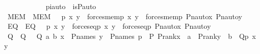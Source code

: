 \begin{isabellebody}
%
\isadelimproof
%
\endisadelimproof
%
\isatagproof
{}\isamarkupfalse%
\ {\isacharminus}{\kern0pt}\ \isanewline
\ \ \isamarkupfalse%
\ {\isasympi}\ \isanewline
\ \ \isamarkupfalse%
\ piauto\ {\isacharcolon}{\kern0pt}\ {\isachardoublequoteopen}is{\isacharunderscore}{\kern0pt}P{\isacharunderscore}{\kern0pt}auto{\isacharparenleft}{\kern0pt}{\isasympi}{\isacharparenright}{\kern0pt}{\isachardoublequoteclose}\isanewline
\isanewline
\ \ \isamarkupfalse%
\ MEM\ \ {\isachardoublequoteopen}MEM\ {\isasymequiv}\ {\isasymlambda}\ p\ x\ y\ {\isachardot}{\kern0pt}\ {\isacharparenleft}{\kern0pt}forces{\isacharunderscore}{\kern0pt}mem{\isacharparenleft}{\kern0pt}p{\isacharcomma}{\kern0pt}\ x{\isacharcomma}{\kern0pt}\ y{\isacharparenright}{\kern0pt}\ {\isasymlongleftrightarrow}\ forces{\isacharunderscore}{\kern0pt}mem{\isacharparenleft}{\kern0pt}{\isasympi}{\isacharbackquote}{\kern0pt}p{\isacharcomma}{\kern0pt}\ Pn{\isacharunderscore}{\kern0pt}auto{\isacharparenleft}{\kern0pt}{\isasympi}{\isacharparenright}{\kern0pt}{\isacharbackquote}{\kern0pt}x{\isacharcomma}{\kern0pt}\ Pn{\isacharunderscore}{\kern0pt}auto{\isacharparenleft}{\kern0pt}{\isasympi}{\isacharparenright}{\kern0pt}{\isacharbackquote}{\kern0pt}y{\isacharparenright}{\kern0pt}{\isacharparenright}{\kern0pt}{\isachardoublequoteclose}\isanewline
\ \ \isamarkupfalse%
\ EQ\ \ {\isachardoublequoteopen}EQ\ {\isasymequiv}\ {\isasymlambda}\ p\ x\ y\ {\isachardot}{\kern0pt}\ {\isacharparenleft}{\kern0pt}forces{\isacharunderscore}{\kern0pt}eq{\isacharparenleft}{\kern0pt}p{\isacharcomma}{\kern0pt}\ x{\isacharcomma}{\kern0pt}\ y{\isacharparenright}{\kern0pt}\ {\isasymlongleftrightarrow}\ forces{\isacharunderscore}{\kern0pt}eq{\isacharparenleft}{\kern0pt}{\isasympi}{\isacharbackquote}{\kern0pt}p{\isacharcomma}{\kern0pt}\ Pn{\isacharunderscore}{\kern0pt}auto{\isacharparenleft}{\kern0pt}{\isasympi}{\isacharparenright}{\kern0pt}{\isacharbackquote}{\kern0pt}x{\isacharcomma}{\kern0pt}\ Pn{\isacharunderscore}{\kern0pt}auto{\isacharparenleft}{\kern0pt}{\isasympi}{\isacharparenright}{\kern0pt}{\isacharbackquote}{\kern0pt}y{\isacharparenright}{\kern0pt}{\isacharparenright}{\kern0pt}{\isachardoublequoteclose}\isanewline
\ \ \isamarkupfalse%
\ Q\ \ {\isachardoublequoteopen}Q\ {\isasymequiv}\ {\isasymlambda}\ Q\ a\ b{\isachardot}{\kern0pt}\ {\isasymforall}x\ {\isasymin}\ P{\isacharunderscore}{\kern0pt}names{\isachardot}{\kern0pt}\ {\isasymforall}y\ {\isasymin}\ P{\isacharunderscore}{\kern0pt}names{\isachardot}{\kern0pt}\ {\isasymforall}p\ {\isasymin}\ P{\isachardot}{\kern0pt}\ P{\isacharunderscore}{\kern0pt}rank{\isacharparenleft}{\kern0pt}x{\isacharparenright}{\kern0pt}\ {\isasymle}\ a\ {\isasymlongrightarrow}\ P{\isacharunderscore}{\kern0pt}rank{\isacharparenleft}{\kern0pt}y{\isacharparenright}{\kern0pt}\ {\isasymle}\ b\ {\isasymlongrightarrow}\ Q{\isacharparenleft}{\kern0pt}p{\isacharcomma}{\kern0pt}\ x{\isacharcomma}{\kern0pt}\ y{\isacharparenright}{\kern0pt}{\isachardoublequoteclose}\ \isanewline

\end{isabellebody}

